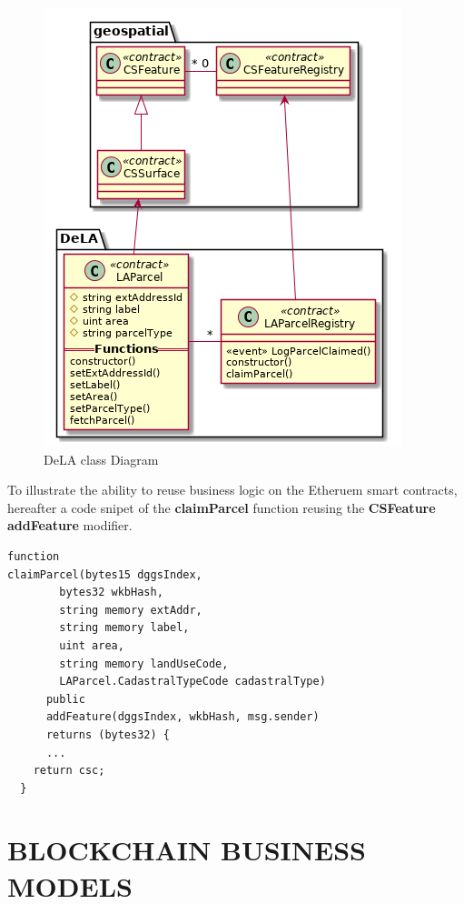 \documentclass{isprs} %
\begin{document}
\begin{figure}[ht!]
\begin{center}
		\includegraphics[width=1.0\columnwidth]{figures/class-dela.png}
	\caption{DeLA class Diagram}
\label{fig:figure_dela_class}
\end{center}
\end{figure}

To illustrate the ability to reuse business logic on the Etheruem smart contracts, hereafter a code snipet of the \textbf{claimParcel} function reusing the \textbf{CSFeature addFeature} modifier.
\begin{verbatim}
function 
claimParcel(bytes15 dggsIndex,
		bytes32 wkbHash,
		string memory extAddr,
		string memory label,
		uint area,
		string memory landUseCode,
		LAParcel.CadastralTypeCode cadastralType)
      public 
      addFeature(dggsIndex, wkbHash, msg.sender)
      returns (bytes32) {
      ...
    return csc;
  }
\end{verbatim}

\newpage

\section{BLOCKCHAIN BUSINESS MODELS}\label{sec:BLOCKCHAIN BUSINESS MODELS}
\end{document}
